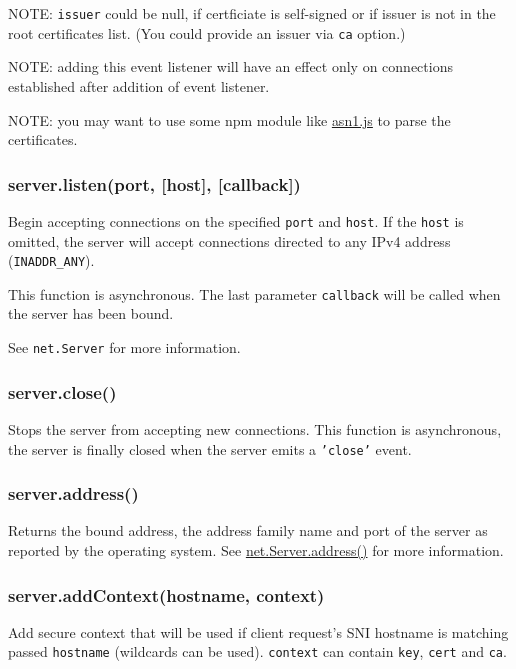 NOTE: \texttt{issuer} could be null, if certficiate is self-signed or if
issuer is not in the root certificates list. (You could provide an
issuer via \texttt{ca} option.)

NOTE: adding this event listener will have an effect only on connections
established after addition of event listener.

NOTE: you may want to use some npm module like
\href{http://npmjs.org/package/asn1.js}{asn1.js} to parse the
certificates.

\subsubsection{server.listen(port, {[}host{]},
{[}callback{]})}\label{server.listenport-host-callback}

Begin accepting connections on the specified \texttt{port} and
\texttt{host}. If the \texttt{host} is omitted, the server will accept
connections directed to any IPv4 address (\texttt{INADDR\_ANY}).

This function is asynchronous. The last parameter \texttt{callback} will
be called when the server has been bound.

See \texttt{net.Server} for more information.

\subsubsection{server.close()}\label{server.close}

Stops the server from accepting new connections. This function is
asynchronous, the server is finally closed when the server emits a
\texttt{'close'} event.

\subsubsection{server.address()}\label{server.address}

Returns the bound address, the address family name and port of the
server as reported by the operating system. See
\href{net.html\#net_server_address}{net.Server.address()} for more
information.

\subsubsection{server.addContext(hostname,
context)}\label{server.addcontexthostname-context}

Add secure context that will be used if client request's SNI hostname is
matching passed \texttt{hostname} (wildcards can be used).
\texttt{context} can contain \texttt{key}, \texttt{cert} and
\texttt{ca}.

